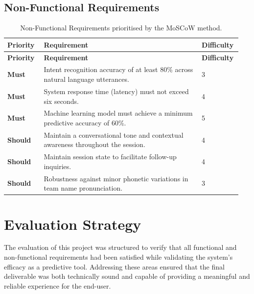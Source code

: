 \subsection{Non-Functional Requirements}
{
\renewcommand{\arraystretch}{1.3}
\begin{longtable}{@{} p{0.15\linewidth} p{0.65\linewidth} p{0.15\linewidth} @{} }
\caption{Non-Functional Requirements prioritised by the MoSCoW method.} \label{tab:non_functional_req} \\
\toprule
\textbf{Priority} & \textbf{Requirement} & \textbf{Difficulty} \\
\midrule
\endfirsthead

\toprule
\textbf{Priority} & \textbf{Requirement} & \textbf{Difficulty} \\
\midrule
\endhead

\bottomrule
\endfoot

\cellcolor{green!15}\textbf{Must} & Intent recognition accuracy of at least 80\% across natural language utterances. & 3 \\
\cellcolor{green!15}\textbf{Must} & System response time (latency) must not exceed six seconds. & 4 \\
\cellcolor{green!15}\textbf{Must} & Machine learning model must achieve a minimum predictive accuracy of 60\%. & 5 \\ \addlinespace
\cellcolor{yellow!15}\textbf{Should} & Maintain a conversational tone and contextual awareness throughout the session. & 4 \\
\cellcolor{yellow!15}\textbf{Should} & Maintain session state to facilitate follow-up inquiries. & 4 \\
\cellcolor{yellow!15}\textbf{Should} & Robustness against minor phonetic variations in team name pronunciation. & 3 \\
\end{longtable}
}

\section{Evaluation Strategy}
The evaluation of this project was structured to verify that all functional and non-functional requirements had been satisfied while validating the system's efficacy as a predictive tool. Addressing these areas ensured that the final deliverable was both technically sound and capable of providing a meaningful and reliable experience for the end-user.

